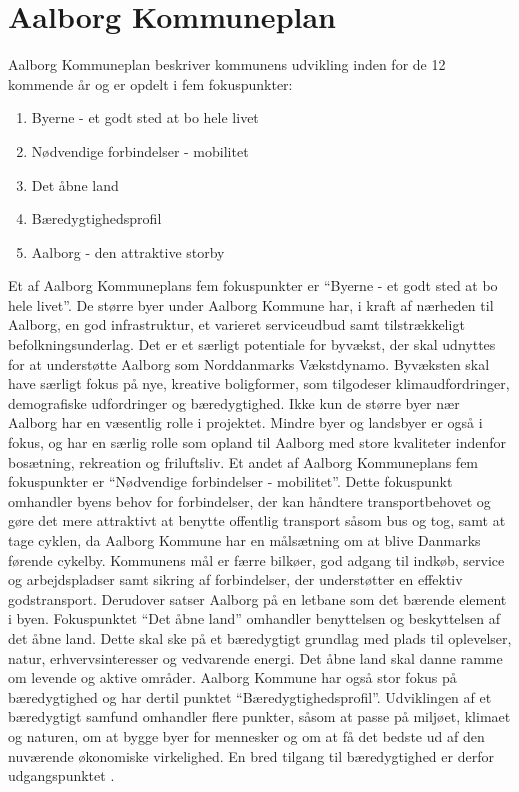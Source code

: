 \section{Aalborg Kommuneplan}
Aalborg Kommuneplan beskriver kommunens udvikling inden for de 12 kommende år og er opdelt i fem fokuspunkter: 
\begin{enumerate}
\item Byerne - et godt sted at bo hele livet
\item Nødvendige forbindelser - mobilitet
\item Det åbne land
\item Bæredygtighedsprofil
\item Aalborg - den attraktive storby
\end{enumerate}
Et af Aalborg Kommuneplans fem fokuspunkter er “Byerne - et godt sted at bo hele livet”. De større byer under Aalborg Kommune har, i kraft af nærheden til Aalborg, en god infrastruktur,  et varieret serviceudbud samt tilstrækkeligt befolkningsunderlag. Det er et særligt potentiale for byvækst, der skal udnyttes for at understøtte Aalborg som Norddanmarks Vækstdynamo. 
\newline \indent{     }  Byvæksten skal have særligt fokus på nye, kreative boligformer, som tilgodeser klimaudfordringer, demografiske udfordringer og bæredygtighed. 
\newline \indent{     }  Ikke kun de større byer nær Aalborg har en væsentlig rolle i projektet. Mindre byer og landsbyer er også i fokus, og har en særlig rolle som opland til Aalborg med store kvaliteter indenfor bosætning, rekreation og friluftsliv.
\newline
\newline
Et andet af Aalborg Kommuneplans fem fokuspunkter er “Nødvendige forbindelser - mobilitet”. Dette fokuspunkt omhandler byens behov for forbindelser, der kan håndtere transportbehovet og gøre det mere attraktivt at benytte offentlig transport såsom bus og tog, samt at tage cyklen, da  Aalborg Kommune har en målsætning om at blive Danmarks førende cykelby. Kommunens mål er færre bilkøer, god adgang til indkøb, service og arbejdspladser samt sikring af forbindelser, der understøtter en effektiv godstransport. Derudover satser Aalborg på en letbane som det bærende element i byen.
\newline
\newline
Fokuspunktet “Det åbne land” omhandler benyttelsen og beskyttelsen af det åbne land. Dette skal ske på et bæredygtigt grundlag med plads til oplevelser, natur, erhvervsinteresser og vedvarende energi. Det åbne land skal danne ramme om levende og aktive områder.
\newline
\newline
Aalborg Kommune har også stor fokus på bæredygtighed og har dertil punktet “Bæredygtighedsprofil”. Udviklingen af et bæredygtigt samfund omhandler flere punkter, såsom at passe på miljøet, klimaet og naturen, om at bygge byer for mennesker og om at få det bedste ud af den nuværende økonomiske virkelighed. En bred tilgang til bæredygtighed er derfor udgangspunktet \citep{kommuneplan2}.

